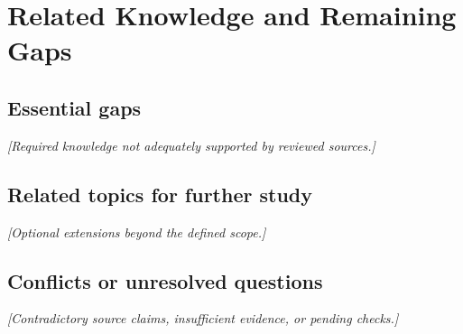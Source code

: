 \section{Related Knowledge and Remaining Gaps}
\label{sec:gaps}

\subsection{Essential gaps}
\emph{[Required knowledge not adequately supported by reviewed sources.]}

\subsection{Related topics for further study}
\emph{[Optional extensions beyond the defined scope.]}

\subsection{Conflicts or unresolved questions}
\emph{[Contradictory source claims, insufficient evidence, or pending checks.]}
